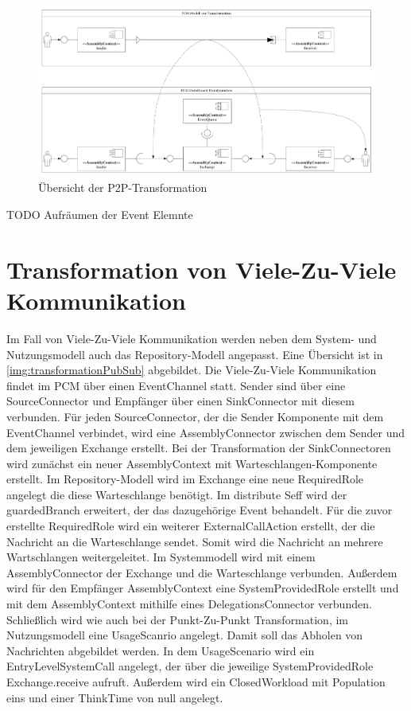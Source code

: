 \begin{figure}
\center
  \includegraphics[width=1\textwidth]{images/transformation/transformationSystemP2P.pdf}
  \caption{Übersicht der P2P-Transformation}
  \label{img:transformationP2P}
\end{figure}

TODO Aufräumen der Event Elemnte

\section{Transformation von Viele-Zu-Viele Kommunikation}
Im Fall von Viele-Zu-Viele Kommunikation werden neben dem System- und Nutzungsmodell auch das Repository-Modell angepasst. Eine Übersicht ist in \autoref{img:transformationPubSub} abgebildet. Die Viele-Zu-Viele Kommunikation findet im PCM über einen EventChannel statt. Sender sind über eine SourceConnector und Empfänger über einen SinkConnector mit diesem verbunden. Für jeden SourceConnector, der die Sender Komponente mit dem EventChannel verbindet, wird eine AssemblyConnector zwischen dem Sender und dem jeweiligen Exchange erstellt. Bei der Transformation der SinkConnectoren wird zunächst ein neuer AssemblyContext mit Warteschlangen-Komponente erstellt. Im Repository-Modell wird im Exchange eine neue RequiredRole angelegt die diese Warteschlange benötigt. Im distribute Seff wird der guardedBranch erweitert, der das dazugehörige Event behandelt. Für die zuvor erstellte RequiredRole wird ein weiterer ExternalCallAction erstellt, der die Nachricht an die Warteschlange sendet. Somit wird die Nachricht an mehrere Wartschlangen weitergeleitet. Im Systemmodell wird mit einem AssemblyConnector der Exchange und die Warteschlange verbunden. Außerdem wird für den Empfänger AssemblyContext eine SystemProvidedRole erstellt und mit dem AssemblyContext mithilfe eines DelegationsConnector verbunden. Schließlich wird wie auch bei der Punkt-Zu-Punkt Transformation, im Nutzungsmodell eine UsageScanrio angelegt. Damit soll das Abholen von Nachrichten abgebildet werden. In dem UsageScenario wird ein EntryLevelSystemCall angelegt, der über die jeweilige SystemProvidedRole Exchange.receive aufruft. Außerdem wird ein ClosedWorkload mit Population eins und einer ThinkTime von null angelegt.

